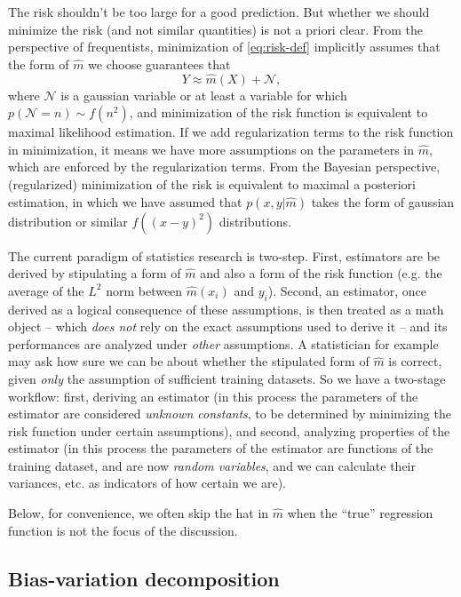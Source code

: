 \documentclass[hyperref, a4paper]{article}
\begin{document}
The risk shouldn't be too large for a good prediction.
But whether we should minimize the risk (and not similar quantities) is not a priori clear.
From the perspective of frequentists,
minimization of \eqref{eq:risk-def} implicitly assumes that 
the form of $\hat{m}$ we choose guarantees that 
\begin{equation}
    Y \approx \hat{m}(X) + \mathcal{N},
    \label{eq:y-and-x-noise}
\end{equation}
where $\mathcal{N}$ is a gaussian variable or at least a variable 
for which $p(\mathcal{N} = n) \sim f(n^2)$,
and minimization of the risk function is equivalent to maximal likelihood estimation.
If we add regularization terms to the risk function in minimization,
it means we have more assumptions on the parameters in $\hat{m}$,
which are enforced by the regularization terms.
From the Bayesian perspective, (regularized) minimization of the risk
is equivalent to maximal a posteriori estimation,
in which we have assumed that $p(x, y | \hat{m})$ takes the form of gaussian distribution
or similar $f((x - y)^2)$ distributions.

The current paradigm of statistics research is two-step.
First, estimators are be derived by stipulating a form of $\hat{m}$ and also a form of the risk function
(e.g. the average of the $L^2$ norm between $\hat{m}(x_i)$ and $y_i$).
Second, an estimator, once derived as a logical consequence of these assumptions,
is then treated as a math object -- which \emph{does not} rely on the exact assumptions used to derive it --
and its performances are analyzed under \emph{other} assumptions.
A statistician for example may ask how sure we can be about 
whether the stipulated form of $\hat{m}$ is correct,
given \emph{only} the assumption of sufficient training datasets.
So we have a two-stage workflow:
first, deriving an estimator (in this process the parameters of the estimator are considered 
\emph{unknown constants}, to be determined by minimizing the risk function under certain assumptions),
and second, analyzing properties of the estimator 
(in this process the parameters of the estimator are functions of the training dataset,
and are now \emph{random variables},
and we can calculate their variances, etc. as indicators of how certain we are).

Below, for convenience, we often skip the hat in $\hat{m}$
when the ``true'' regression function is not the focus of the discussion.

\subsection{Bias-variation decomposition}
\end{document}
